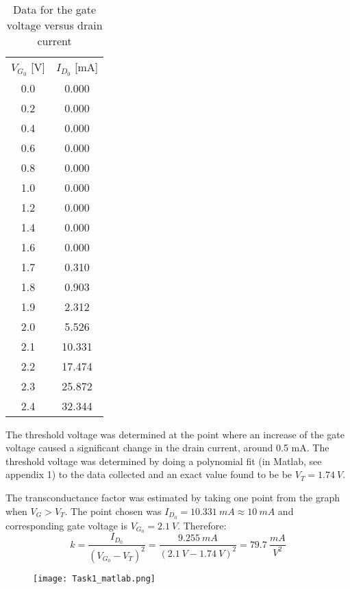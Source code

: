    \begin{table}[htbp]
     \centering
     \caption{Data for the gate voltage versus drain current}
       \begin{tabular}{cc}
       $V_{G_0}$ [V]       & $I_{D_0}$ [mA] \\
       0.0          & 0.000 \\
       0.2          & 0.000 \\
       0.4          & 0.000 \\
       0.6          & 0.000 \\
       0.8          & 0.000 \\
       1.0          & 0.000 \\
       1.2          & 0.000 \\
       1.4          & 0.000 \\
       1.6          & 0.000 \\
       1.7          & 0.310 \\
       1.8          & 0.903 \\
       1.9          & 2.312 \\
       2.0          & 5.526 \\
       2.1          & 10.331 \\
       2.2          & 17.474 \\
       2.3          & 25.872 \\
       2.4          & 32.344 \\

       \end{tabular}%
     \label{tab:addlabel}%
   \end{table}%
The threshold voltage was determined at the point where an increase of the gate voltage caused a significant change in the drain current, around 0.5 mA. The threshold voltage was determined by doing a polynomial fit (in Matlab, see appendix 1) to the data collected and an exact value found to be be $V_T = 1.74 \ V$.


The transconductance factor was estimated by taking one point from the graph when $V_G > V_T$. The point chosen was $I_{D_0}  = 10.331 \ mA  \approx 10 \ mA$ and corresponding gate voltage is $V_{G_0} = 2.1 \ V$. Therefore: $$ k = \dfrac{I_{D_0}}{(V_{G_0}-V_T)^2} = \dfrac{9.255 \ mA}{(2.1 \ V - 1.74 \ V)^2} = 79.7 \ \dfrac{mA}{V^2} $$

\begin{figure}[h!]
        \centering
        \texttt{[image: Task1\_matlab.png]}
\end{figure}


\pagebreak